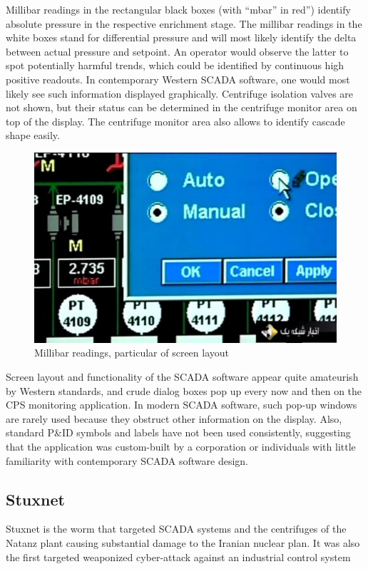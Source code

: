 \documentclass[12pt]{article}
\begin{document}
Millibar readings in the rectangular black boxes (with “mbar” in red”) identify absolute pressure in the respective enrichment stage. The millibar readings in the white boxes stand for differential pressure and will most likely identify the delta between actual pressure and setpoint. An operator would observe the latter to spot potentially harmful trends, which could be identified by continuous high positive readouts. In contemporary Western SCADA software, one would most likely see such information displayed graphically. Centrifuge isolation valves are not shown, but their status can be determined in the centrifuge monitor area on top of the display. The centrifuge monitor area also allows to identify cascade shape easily. 

 \begin{figure}[H]
    \centering
    \includegraphics[height=0.6\textwidth]{scadaBlu.png}
    \caption{Millibar readings, particular of screen layout}
    \label{fig:scadaBlu}
    \end{figure}

Screen layout and functionality of the SCADA software appear quite amateurish by Western standards, and crude dialog boxes pop up every now and then on the CPS monitoring application. In modern SCADA software, such pop-up windows are rarely used because they obstruct other information on the display. Also, standard P\&ID symbols and labels have not been used consistently, suggesting that the application was custom-built by a corporation or individuals with little familiarity with contemporary SCADA software design.

\subsection{Stuxnet}
Stuxnet is the worm that targeted SCADA systems and the centrifuges of the Natanz plant causing substantial damage to the Iranian nuclear plan. It was also the first targeted weaponized cyber-attack against an industrial control system
\end{document}
